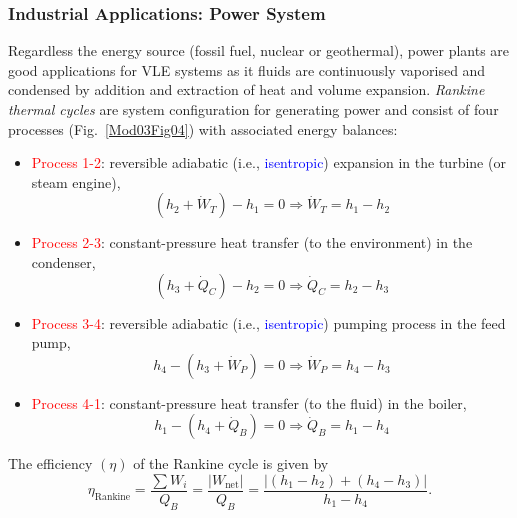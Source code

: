 \documentclass[12pts,a4paper,amsmath,amssymb,floatfix]{article}%
\newcommand{\frc}{\displaystyle\frac}
\newcommand{\blue}{\textcolor{blue}}
\begin{document}
   \subsubsection{Industrial Applications: Power System}
Regardless the energy source (fossil fuel, nuclear or geothermal), power plants are good applications for VLE systems as it fluids are continuously vaporised and condensed by addition and extraction of heat and volume expansion. {\it Rankine thermal cycles} are system configuration for generating power and consist of four processes (Fig.~\ref{Mod03Fig04}) with associated energy balances:
     \begin{itemize}
      \item \textcolor{red}{Process 1-2}: reversible adiabatic (i.e., \blue{isentropic}) expansion in the turbine (or steam engine),
            \begin{displaymath}
               \left(h_{2} + \dot{W}_{T}\right)-h_{1} = 0 \Rightarrow \dot{W}_{T} = h_{1}-h_{2}
            \end{displaymath}
      \item \textcolor{red}{Process 2-3}: constant-pressure heat transfer (to the environment) in the condenser,
            \begin{displaymath}
               \left(h_{3} + \dot{Q}_{C}\right)-h_{2} = 0 \Rightarrow \dot{Q}_{C} = h_{2}-h_{3}
            \end{displaymath}
      \item \textcolor{red}{Process 3-4}: reversible adiabatic (i.e., \blue{isentropic}) pumping process in the feed pump,
            \begin{displaymath}
               h_{4} - \left(h_{3} + \dot{W}_{P}\right) = 0 \Rightarrow \dot{W}_{P} = h_{4}-h_{3}
            \end{displaymath}
      \item \textcolor{red}{Process 4-1}: constant-pressure heat transfer (to the fluid) in the boiler,
            \begin{displaymath}
               h_{1} - \left(h_{4} + \dot{Q}_{B}\right) = 0 \Rightarrow \dot{Q}_{B} = h_{1}-h_{4}
            \end{displaymath} 
     \end{itemize}
     The efficiency $\left(\eta\right)$ of the Rankine cycle is given by
           \begin{displaymath}
               \eta_{\text{Rankine}} = \frc{\sum W_{i}}{Q_{B}} = \frc{\left|W_{\text{net}}\right|}{Q_{B}} = \frc{\left|\left(h_{1}-h_{2}\right)+\left(h_{4}-h_{3}\right)\right|}{h_{1}-h_{4}}.
           \end{displaymath}
\end{document}
